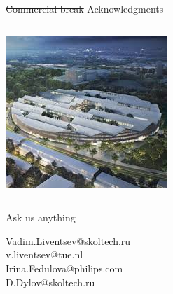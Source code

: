 \documentclass[pdf]{beamer}
\newcommand{\?}{\ensuremath{^\texttt{\bf [CITATION~NEEDED]}}}
\begin{document}
\begin{frame}{\st{Commercial break} Acknowledgments}
\begin{columns}[T]
\begin{column}{5cm}
\includegraphics[width=\textwidth]{img/skoltech-campus.jpeg}
\end{column}

\end{columns}


\end{frame}

\begin{frame}{Ask us anything}

Vadim.Liventsev@skoltech.ru \\
v.liventsev@tue.nl \\
Irina.Fedulova@philips.com \\
D.Dylov@skoltech.ru

\end{frame}
\end{document}
